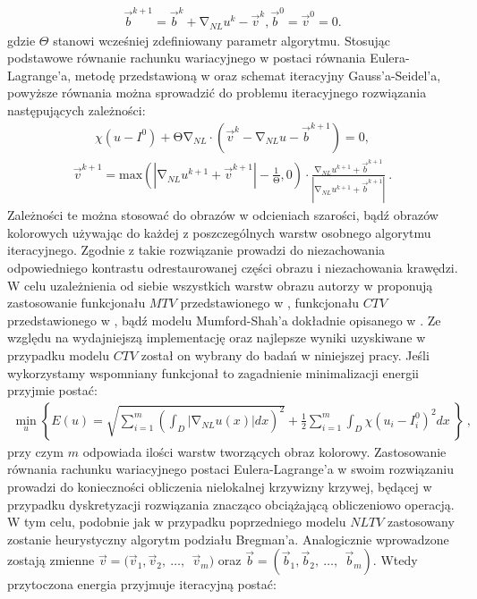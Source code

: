 \documentclass[12pt, twoside, openany]{report}
\theoremstyle{definition}
\begin{document}
\begin{align}
{\overrightarrow{b}}^{k+1}={\overrightarrow{b}}^k+{\mathrm{\nabla }}_{NL}u^k-{\overrightarrow{v}}^k, {\overrightarrow{b}}^0={\overrightarrow{v}}^0=0.
\label{BREGMANVARIABLE}
\end{align}
gdzie $\Theta$ stanowi wcześniej zdefiniowany parametr algorytmu. Stosując podstawowe równanie rachunku wariacyjnego w postaci równania Eulera-Lagrange’a, metodę przedstawioną w \cite{tai2011fast} oraz schemat iteracyjny Gauss’a-Seidel’a, powyższe równania można sprowadzić do problemu iteracyjnego rozwiązania następujących zależności:
\begin{align}
\chi \left(u-I^0\right)+\mathrm{\Theta }{\mathrm{\nabla }}_{NL}\cdot \left({\overrightarrow{v}}^k-{\mathrm{\nabla }}_{NL}u-{\overrightarrow{b}}^{k+1}\right)=0,
\label{ELNLTV1}
\end{align}
\begin{align}
{\overrightarrow{v}}^{k+1}\mathrm{=}{\mathrm{max} \left(\left|{\mathrm{\nabla }}_{NL}u^{k+1}+{\overrightarrow{v}}^{k+1}\right|-\frac{1}{\mathrm{\Theta }},0\right)\cdot\frac{{\mathrm{\nabla }}_{NL}u^{k+1}+{\overrightarrow{b}}^{k+1}}{\left|{\mathrm{\nabla }}_{NL}u^{k+1}+{\overrightarrow{b}}^{k+1}\right|}\ }.
\label{ELNLTV2}
\end{align}
Zależności te można stosować do obrazów w odcieniach szarości, bądź obrazów kolorowych używając do  każdej z poszczególnych warstw osobnego algorytmu iteracyjnego. Zgodnie z \cite{duan2015fast} takie rozwiązanie prowadzi do niezachowania odpowiedniego kontrastu odrestaurowanej części obrazu i niezachowania krawędzi.
W celu uzależnienia od siebie wszystkich warstw obrazu autorzy w \cite{duan2015fast} proponują zastosowanie funkcjonału $MTV$ przedstawionego w \cite{yang2009fast}, funkcjonału $CTV$ przedstawionego w \cite{blomgren1998color}, bądź modelu Mumford-Shah’a dokładnie opisanego w \cite{jung2011nonlocal}. Ze względu na wydajniejszą implementację oraz najlepsze wyniki uzyskiwane w przypadku modelu \textbf{$CTV$} został on wybrany do badań w niniejszej pracy. Jeśli wykorzystamy wspomniany funkcjonał to zagadnienie minimalizacji energii przyjmie postać:
\begin{align}
{\mathop{\mathrm{min}}_{u} \left\{E\left(u\right)=\sqrt{\sum^m_{i=1}{{\left(\int_D{\left|{\mathrm{\nabla }}_{NL}u(x)\right|}dx\right)}^2}}+\frac{1}{2}\sum^m_{i=1}{\int_D{\chi{\left(u_i-I^0_i\right)}^2}dx}\ \right\}\ },
\label{ENLCTV}
\end{align}
przy czym $m$ odpowiada ilości warstw tworzących obraz kolorowy. Zastosowanie równania rachunku wariacyjnego postaci Eulera-Lagrange’a w swoim rozwiązaniu prowadzi do konieczności obliczenia nielokalnej krzywizny krzywej, będącej w przypadku dyskretyzacji rozwiązania znacząco obciążającą obliczeniowo operacją. W tym celu, podobnie jak w przypadku poprzedniego modelu $NLTV$ zastosowany zostanie heurystyczny algorytm podziału Bregman’a. Analogicznie wprowadzone zostają zmienne $\overrightarrow{v}=\big({\overrightarrow{v}}_1,{\overrightarrow{v}}_2,\ \dots ,\ \ {\overrightarrow{v}}_m\big)$ oraz $\overrightarrow{b}=\left({\overrightarrow{b}}_1,{\overrightarrow{b}}_2,\ \dots ,\ \ {\overrightarrow{b}}_m\right)$. Wtedy przytoczona energia przyjmuje iteracyjną postać:
\end{document}
